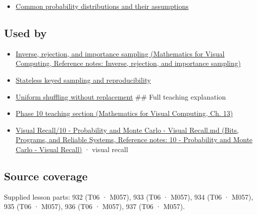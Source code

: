 \begin{itemize}
\tightlist
\item
  \hyperref[appendix-a2360b435383]{Common probability distributions and their assumptions}
\end{itemize}

\subsection{Used by}\label{appendix-e0f7c7e08f3a-used-by}

\hypertarget{appendix-e0f7c7e08f3a-used-by}{}

\begin{itemize}
\item
  \href{../02-Mathematics-for-Visual-Computing/main.pdf\#nameddest=appendix-8d863ed954d0}{Inverse, rejection, and importance sampling (Mathematics for Visual Computing, Reference notes: Inverse, rejection, and importance sampling)}
\item
  \hyperref[appendix-daaf25bfd3a0]{Stateless keyed sampling and reproducibility}
\item
  \hyperref[appendix-184fcc411663]{Uniform shuffling without replacement} \#\# Full teaching explanation
\item
  \href{../02-Mathematics-for-Visual-Computing/main.pdf\#nameddest=02-foundations-ii-ch029-a-computer-produces-deterministic-pseudorandom-sequences}{Phase 10 teaching section (Mathematics for Visual Computing, Ch. 13)}
\item
  \href{../01-Bits-Programs-and-Reliable-Systems/main.pdf\#nameddest=appendix-cb5af353ef77}{Visual Recall/10 - Probability and Monte Carlo - Visual Recall.md (Bits, Programs, and Reliable Systems, Reference notes: 10 - Probability and Monte Carlo - Visual Recall)} · visual recall
\end{itemize}

\subsection{Source coverage}\label{appendix-e0f7c7e08f3a-source-coverage}

\hypertarget{appendix-e0f7c7e08f3a-source-coverage}{}

Supplied lesson parts: 932 (T06 · M057), 933 (T06 · M057), 934 (T06 · M057), 935 (T06 · M057), 936 (T06 · M057), 937 (T06 · M057).
